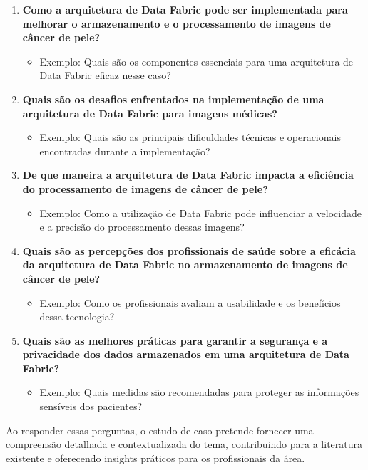 \begin{enumerate}
    \item \textbf{Como a arquitetura de Data Fabric pode ser implementada para melhorar o armazenamento e o processamento de imagens de câncer de pele?}
    \begin{itemize}
        \item Exemplo: Quais são os componentes essenciais para uma arquitetura de Data Fabric eficaz nesse caso?
    \end{itemize}

    \item \textbf{Quais são os desafios enfrentados na implementação de uma arquitetura de Data Fabric para imagens médicas?}
    \begin{itemize}
        \item Exemplo: Quais são as principais dificuldades técnicas e operacionais encontradas durante a implementação?
    \end{itemize}

    \item \textbf{De que maneira a arquitetura de Data Fabric impacta a eficiência do processamento de imagens de câncer de pele?}
    \begin{itemize}
        \item Exemplo: Como a utilização de Data Fabric pode influenciar a velocidade e a precisão do processamento dessas imagens?
    \end{itemize}

    \item \textbf{Quais são as percepções dos profissionais de saúde sobre a eficácia da arquitetura de Data Fabric no armazenamento de imagens de câncer de pele?}
    \begin{itemize}
        \item Exemplo: Como os profissionais avaliam a usabilidade e os benefícios dessa tecnologia?
    \end{itemize}

    \item \textbf{Quais são as melhores práticas para garantir a segurança e a privacidade dos dados armazenados em uma arquitetura de Data Fabric?}
    \begin{itemize}
        \item Exemplo: Quais medidas são recomendadas para proteger as informações sensíveis dos pacientes?
    \end{itemize}
\end{enumerate}

Ao responder essas perguntas, o estudo de caso pretende fornecer uma compreensão detalhada e contextualizada do tema, contribuindo para a literatura existente e oferecendo insights práticos para os profissionais da área.